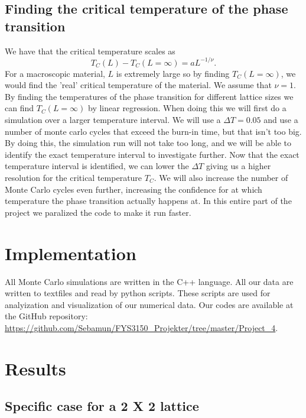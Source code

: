 \documentclass{article}
\begin{document}
\begin{multicols}{2}
\subsection{Finding the critical temperature of the phase transition}

We have that the critical temperature scales as 
\begin{equation}
	T_C(L)-T_C(L=\infty)=aL^{-1/\nu}.
\end{equation}
For a macroscopic material, $L$ is extremely large so by finding $T_C(L=\infty)$, we would find the 'real' critical temperature of the material. We assume that $\nu=1$. By finding the temperatures of the phase transition for different lattice sizes we can find $T_C(L=\infty)$ by linear regression. When doing this we will first do a simulation over a larger temperature interval. We will use a $\Delta T=0.05$ and use a number of monte carlo cycles that exceed the burn-in time, but that isn't too big. By doing this, the simulation run will not take too long, and we will be able to identify the exact temperature interval to investigate further. Now that the exact temperature interval is identified, we can lower the $\Delta T$ giving us a higher resolution for the critical temperature $T_C$. We will also increase the number of Monte Carlo cycles even further, increasing the confidence for at which temperature the phase transition actually happens at. In this entire part of the project we paralized the code to make it run faster. 

\section{Implementation}

All Monte Carlo simulations are written in the C++ language. All our data are written to textfiles and read by python scripts. These scripts are used for analyization and visualization of our numerical data. Our codes are available at the GitHub repository: \\
\url{https://github.com/Sebamun/FYS3150_Projekter/tree/master/Project_4}.

\section{Results}

\subsection{Specific case for a 2 X 2 lattice}


\end{multicols}
\end{document}
